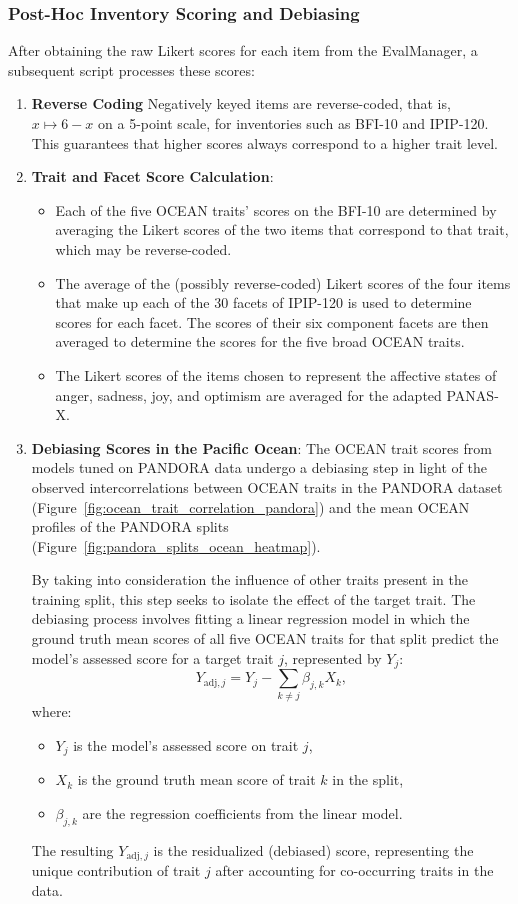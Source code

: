 \documentclass{DESSThesis}
\begin{document}
\subsubsection{Post-Hoc Inventory Scoring and Debiasing}
After obtaining the raw Likert scores for each item from the EvalManager, a subsequent script processes these scores:
\begin{enumerate}
\item \textbf{Reverse Coding} Negatively keyed items are reverse-coded, that is, \(x \mapsto 6 - x\) on a 5-point scale, for inventories such as BFI-10 and IPIP-120. This guarantees that higher scores always correspond to a higher trait level.

\item \textbf{Trait and Facet Score Calculation}:
\begin{itemize}
\item Each of the five OCEAN traits' scores on the BFI-10 are determined by averaging the Likert scores of the two items that correspond to that trait, which may be reverse-coded.
\item The average of the (possibly reverse-coded) Likert scores of the four items that make up each of the 30 facets of IPIP-120 is used to determine scores for each facet. The scores of their six component facets are then averaged to determine the scores for the five broad OCEAN traits.
\item The Likert scores of the items chosen to represent the affective states of anger, sadness, joy, and optimism are averaged for the adapted PANAS-X.
\end{itemize}

\item \textbf{Debiasing Scores in the Pacific Ocean}: The OCEAN trait scores from models tuned on PANDORA data undergo a debiasing step in light of the observed intercorrelations between OCEAN traits in the PANDORA dataset (Figure~\ref{fig:ocean_trait_correlation_pandora}) and the mean OCEAN profiles of the PANDORA splits (Figure~\ref{fig:pandora_splits_ocean_heatmap}).

By taking into consideration the influence of other traits present in the training split, this step seeks to isolate the effect of the target trait. The debiasing process involves fitting a linear regression model in which the ground truth mean scores of all five OCEAN traits for that split predict the model's assessed score for a target trait \(j\), represented by \(Y_j\):
\[
    Y_{\text{adj},j} = Y_{j} - \sum_{k \neq j} \beta_{j,k} X_{k},
\]
where:
\begin{itemize}
        \item \(Y_{j}\) is the model's assessed score on trait \(j\),
        \item \(X_{k}\) is the ground truth mean score of trait \(k\) in the split,
        \item \(\beta_{j,k}\) are the regression coefficients from the linear model.
\end{itemize}

    The resulting \(Y_{\text{adj},j}\) is the residualized (debiased) score, representing the unique contribution of trait \(j\) after accounting for co-occurring traits in the data.
\end{enumerate}
\end{document}
